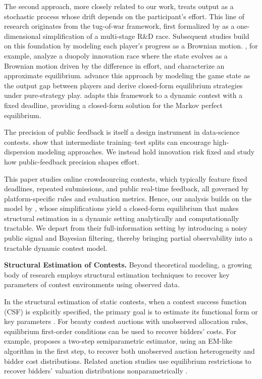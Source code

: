 \documentclass[mnsc]{informs3}
\begin{document}
The second approach, more closely related to our work, treats output as a stochastic process whose drift depends on the participant’s effort.
This line of research originates from the tug-of-war framework, first formalized by \citet{Harris1987Race} as a one-dimensional simplification of a multi-stage R\&D race.
Subsequent studies build on this foundation by modeling each player’s progress as a Brownian motion.
\citet{budd1993Duopoly}, for example, analyze a duopoly innovation race where the state evolves as a Brownian motion driven by the difference in effort, and characterize an approximate equilibrium.
\citet{Moscarini2007Contest} advance this approach by modeling the game state as the output gap between players and derive closed-form equilibrium strategies under pure-strategy play.
\citet{Ryvkin2022Fight} adapts this framework to a dynamic contest with a fixed deadline, providing a closed-form solution for the Markov perfect equilibrium.

The precision of public feedback is itself a design instrument in data-science contests. 
\citet{huang_2024_designing} show that intermediate training–test splits can encourage high-dispersion modeling approaches.
We instead hold innovation risk fixed and study how public-feedback precision shapes effort.


This paper studies online crowdsourcing contests, which typically feature fixed deadlines, repeated submissions, and public real-time feedback, all governed by platform-specific rules and evaluation metrics.
Hence, our analysis builds on the model by \citet{Ryvkin2022Fight}, whose simplifications yield a closed-form equilibrium that makes structural estimation in a dynamic setting analytically and computationally tractable.
We depart from their full-information setting by introducing a noisy public signal and Bayesian filtering, thereby bringing partial observability into a tractable dynamic contest model.



\textbf{Structural Estimation of Contests.}
Beyond theoretical modeling, a growing body of research employs structural estimation techniques to recover key parameters of contest environments using observed data.

In the structural estimation of static contests, when a contest success function (CSF) is explicitly specified, the primary goal is to estimate its functional form or key parameters \citep{hwang2012technology, kang2016policy, huang2021structural}.
For beauty contest auctions with unobserved allocation rules, equilibrium first-order conditions can be used to recover bidders' costs.
For example, \citet{yoganarasimhan2016estimation} proposes a two-step semiparametric estimator, using an EM-like algorithm in the first step, to recover both unobserved auction heterogeneity and bidder cost distributions.
Related auction studies use equilibrium restrictions to recover bidders' valuation distributions nonparametrically \citep{guerre2000optimal, shakhgildyan2022nonparametric}.
\end{document}
